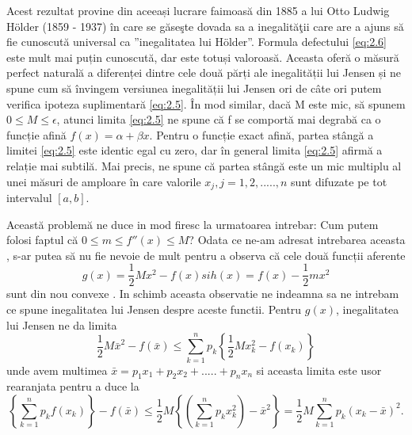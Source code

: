 \documentclass[a4paper,12pt,oneside]{report}
\begin{document}
Acest rezultat provine din aceeași lucrare faimoasă din 1885 a lui Otto Ludwig Hölder (1859 - 1937) în care se găseşte dovada sa a inegalităţii care are a ajuns să fie cunoscută universal ca ”inegalitatea lui Hölder”. Formula defectului \ref{eq:2.6} este mult mai puțin cunoscută, dar este totuși valoroasă. Aceasta oferă o măsură perfect naturală a diferenței dintre cele două părți ale inegalității lui Jensen și ne spune cum să învingem versiunea  inegalității lui Jensen ori de câte ori putem verifica ipoteza suplimentară \ref{eq:2.5}. 
În mod similar, dacă M este mic, să spunem \(0 \leq M \leq \epsilon\), atunci limita \ref{eq:2.5} ne spune că f se comportă mai degrabă ca o funcție afină \(f\left ( x \right ) = \alpha  + \beta x\). Pentru o funcție exact afină, partea stângă a limitei \ref{eq:2.5} este identic egal cu zero, dar în general limita \ref{eq:2.5} afirmă a relație mai subtilă. Mai precis, ne spune că partea stângă este un mic multiplu al unei măsuri de amploare  în care valorile \(x_{j}, j = 1,2,.....,n \) sunt difuzate pe tot intervalul \(\left [ a, b \right ]. \)

Această problemă ne duce in mod firesc la urmatoarea intrebar: Cum putem folosi faptul că \(0\leq m\leq {f}''\left ( x \right )\leq M \)? Odata ce ne-am adresat intrebarea aceasta , s-ar putea să nu fie nevoie de mult pentru a observa că cele două funcții aferente
\begin{displaymath}
  g\left ( x \right ) = \frac{1}{2}Mx^{2} - f\left ( x \right ) si 
h\left ( x \right ) = f\left ( x \right ) - \frac{1}{2}mx^{2}
\end{displaymath}
sunt din nou convexe . In schimb aceasta observatie ne indeamna sa ne intrebam ce spune inegalitatea lui Jensen despre aceste functii. 
	Pentru \(g\left ( x \right )\), inegalitatea lui Jensen ne da limita 
\begin{displaymath}
  \frac{1}{2}M\bar{x}^{2} - f\left ( \bar{x} \right )\leq \sum_{k = 1}^{n}p_{k}\left \{ \frac{1}{2}Mx_{k}^{2} - f\left ( x_{k} \right )\right \}
\end{displaymath}
unde avem multimea \(\bar{x} = p_{1}x_{1}+ p_{2}x_{2}+ ..... + p_{n}x_{n}\) si aceasta limita este usor rearanjata pentru a duce la 
\begin{displaymath}
  \left \{ \sum_{k = 1}^{n} p_{k}f\left ( x_{k} \right )\right \} - f\left (\bar{x}  \right )\leq \frac{1}{2}M\left \{ \left ( \sum_{k=1}^{n} p_{k}x_{k}^{2}\right ) - \bar{x}^{2} \right \} = \frac{1}{2}M\sum_{k = 1}^{n}p_{k}\left ( x_{k} - \bar{x} \right )^{2}. 
\end{displaymath}
\end{document}
